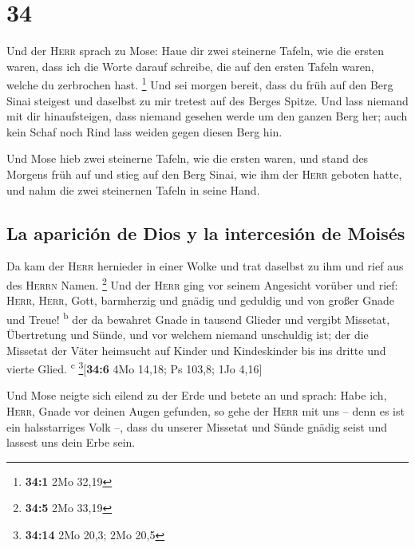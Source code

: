 \hypertarget{section-33}{%
\section{34}\label{section-33}}

 Und der \textsc{Herr} sprach zu Mose: Haue dir zwei
steinerne Tafeln, wie die ersten waren, dass ich die Worte darauf
schreibe, die auf den ersten Tafeln waren, welche du zerbrochen hast.
\footnote{\textbf{34:1} 2Mo 32,19}  Und sei morgen bereit,
dass du früh auf den Berg Sinai steigest und daselbst zu mir tretest auf
des Berges Spitze.  Und lass niemand mit dir
hinaufsteigen, dass niemand gesehen werde um den ganzen Berg her; auch
kein Schaf noch Rind lass weiden gegen diesen Berg hin.

 Und Mose hieb zwei steinerne Tafeln, wie die ersten
waren, und stand des Morgens früh auf und stieg auf den Berg Sinai, wie
ihm der \textsc{Herr} geboten hatte, und nahm die zwei steinernen Tafeln
in seine Hand.

\hypertarget{la-apariciuxf3n-de-dios-y-la-intercesiuxf3n-de-moisuxe9s}{%
\subsection{La aparición de Dios y la intercesión de
Moisés}\label{la-apariciuxf3n-de-dios-y-la-intercesiuxf3n-de-moisuxe9s}}

 Da kam der \textsc{Herr} hernieder in einer Wolke und
trat daselbst zu ihm und rief aus des \textsc{Herrn} Namen. \footnote{\textbf{34:5}
  2Mo 33,19}  Und der \textsc{Herr} ging vor seinem
Angesicht vorüber und rief: \textsc{Herr}, \textsc{Herr}, Gott,
barmherzig und gnädig und geduldig und von großer Gnade und Treue!
\textsuperscript{b}  der da bewahret Gnade in tausend
Glieder und vergibt Missetat, Übertretung und Sünde, und vor welchem
niemand unschuldig ist; der die Missetat der Väter heimsucht auf Kinder
und Kindeskinder bis ins dritte und vierte Glied. \textsuperscript{c}
\footnote{\textbf{34:14} 2Mo 20,3; 2Mo 20,5}{[}\textbf{34:6} 4Mo 14,18;
Ps 103,8; 1Jo 4,16{]}

 Und Mose neigte sich eilend zu der Erde und betete an
 und sprach: Habe ich, \textsc{Herr}, Gnade vor deinen
Augen gefunden, so gehe der \textsc{Herr} mit uns -- denn es ist ein
halsstarriges Volk --, dass du unserer Missetat und Sünde gnädig seist
und lassest uns dein Erbe sein.

